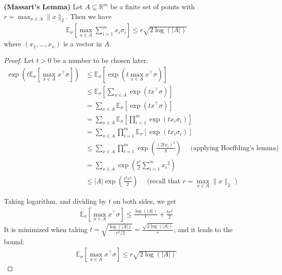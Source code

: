 \documentclass{article}
\newcommand{\bfs}[1]{\textbf{({#1}) }}
\begin{document}
\begin{thma}\bfs{Massart's Lemma}
 Let $A \subseteq \mathbb{R}^{m}$ be a finite set of points with $r=\max _{x \in A}\|x\|_{2}$. Then we have
\begin{align*}
\mathbb{E}_{\sigma }\left[\max _{x \in A} \sum_{i=1}^{m} x_{i} \sigma_{i}\right] \leq r \sqrt{2 \log (|A|)}
\end{align*}
where $\left(x_{1}, \ldots, x_{n}\right)$ is a vector in $A$.
\end{thma}
\begin{proof}
 Let $t>0$ be a number to be chosen later.
\begin{align*}
\exp \left(t \mathbb{E}_{\sigma }\left[\max _{x \in A} x^{\top} \sigma \right]\right) & \leq \mathbb{E}_{\sigma }\left[\exp \left(t \max _{x \in A} x^{\top} \sigma \right)\right] \\
& \leq \mathbb{E}_{\sigma }\left[\sum_{x \in A} \exp \left(t x^{\top} \sigma \right)\right]\\
&=\sum_{x \in A} \mathbb{E}_{\sigma }\left[\exp \left(t x^{\top} \sigma \right)\right]\\
&=\sum_{x \in A} \mathbb{E}_{\sigma }\left[\prod_{i=1}^{m} \exp \left(t x_{i} \sigma_{i}\right)\right] \\
&=\sum_{x \in A} \prod_{i=1}^{m} \mathbb{E}_{\sigma }\left[\exp \left(t x_{i} \sigma_{i}\right)\right] \\
&\leq \sum_{x \in A} \prod_{i=1}^{m} \exp \left(\frac{\left(2 t x_{i}\right)^{2}}{8}\right) \quad \text{ (applying Hoeffding's lemma) }\\
&=\sum_{x \in A} \exp \left(\frac{t^{2}}{2} \sum_{i=1}^{m} x_{i}{ }^{2}\right) \\
&\leq|A| \exp \left(\frac{t^{2} r^{2}}{2}\right) \quad \text{ (recall that $r=\max _{x \in A}\|x\|_{2}$ ) }
\end{align*}


Taking logarithm, and dividing by $t$ on both sides, we get
\begin{align*}
\mathbb{E}_{\sigma }\left[\max _{x \in A} x^{\top} \sigma \right] \leq \frac{\log (|A|)}{t}+\frac{t r^{2}}{2}
\end{align*}
It is minimized when taking $t=\sqrt{\frac{\log (|A|)}{r^{2} / 2}}=\frac{\sqrt{2 \log (|A|)}}{r}$, and it leads to the bound:
\begin{align*}
\mathbb{E}_{\sigma }\left[\max _{x \in A} x^{\top} \sigma \right] \leq r \sqrt{2 \log (|A|)}
\end{align*}
\end{proof}
\end{document}
